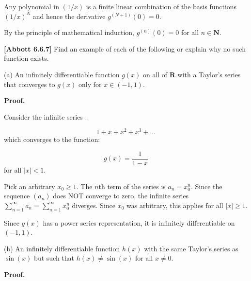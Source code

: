 \documentclass[10pt]{article}
\begin{document}
Any polynomial in $\displaystyle ( 1/x)$ is a finite linear combination of the basis functions $\displaystyle ( 1/x)^{N}$ and hence the derivative $\displaystyle g^{( N+1)}( 0) =0$.



By the principle of mathematical induction, $\displaystyle g^{( n)}( 0) =0$ for all $\displaystyle n\in \mathbf{N}$.



\textbf{[Abbott 6.6.7]} Find an example of each of the following or explain why no such function exists.



(a) An infinitely differentiable function $\displaystyle g( x)$ on all of $\displaystyle \mathbf{R}$ with a Taylor's series that converges to $\displaystyle g( x)$ only for $\displaystyle x\in ( -1,1)$.



\textbf{Proof.}



Consider the infinite series :


\begin{equation*}
1+x+x^{2} +x^{3} +\dotsc 
\end{equation*}
which converges to the function:


\begin{equation*}
g( x) =\frac{1}{1-x}
\end{equation*}
for all $\displaystyle |x|< 1$. 



Pick an arbitrary $\displaystyle x_{0} \geq 1$. The $\displaystyle n$th term of the series is $\displaystyle a_{n} =x_{0}^{n}$. Since the sequence $\displaystyle ( a_{n})$ does NOT converge to zero, the infinite series $\displaystyle \sum _{n=1}^{\infty } a_{n} =\sum _{n=1}^{\infty } x_{0}^{n}$ diverges. Since $\displaystyle x_{0}$ was arbitrary, this applies for all $\displaystyle |x|\geq 1$. 



Since $\displaystyle g( x)$ has a power series representation, it is infinitely differentiable on $\displaystyle ( -1,1)$. 



(b) An infinitely differentiable function $\displaystyle h( x)$ with the same Taylor's series as $\displaystyle \sin( x)$ but such that $\displaystyle h( x) \neq \sin( x)$ for all $\displaystyle x\neq 0$. 



\textbf{Proof.}
\end{document}
